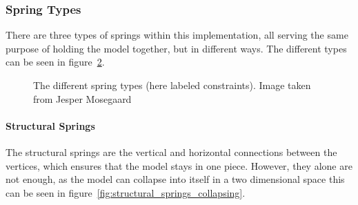 \begin{figure}
    \label{fig:my_cloth_implementation_springs}
\end{figure}

\subsubsection{Spring Types}
There are three types of springs within this implementation, all serving the same purpose of holding the model together,
but in different ways. The different types can be seen in figure~\ref{fig:spring_types}.
\begin{figure}
    \centering
    \caption{The different spring types (here labeled constraints). Image taken from Jesper Mosegaard\cite{mosegaards_clothing_simulation}}
    \label{fig:spring_types}
\end{figure}

\paragraph{Structural Springs}
The structural springs are the vertical and horizontal connections between the vertices, which ensures that the model stays in one piece.
However, they alone are not enough, as the model can collapse into itself in a two dimensional space\cite{jeff_lander_real_time_cloth} this can be seen in figure~\ref{fig:structural_springs_collapsing}.

